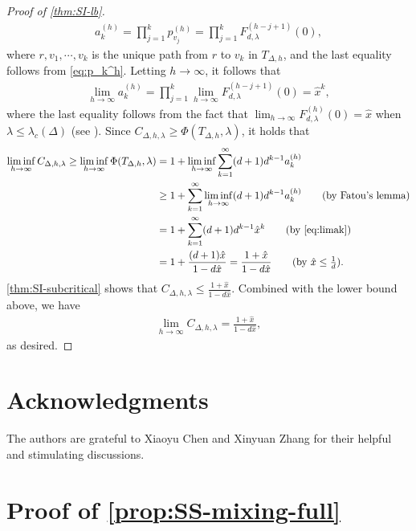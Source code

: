 \documentclass[11pt]{article}
\theoremstyle{plain}
\theoremstyle{definition}
\theoremstyle{remark}
\begin{document}
\begin{proof}[Proof of \cref{thm:SI-lb}]
\begin{align*}
    a_k^{(h)}=\prod_{j=1}^kp^{(h)}_{v_j}=\prod_{j=1}^kF_{d,\lambda}^{(h-j+1)}(0),
\end{align*}
where $r,v_1,\cdots,v_k$ is the unique path from $r$ to $v_k$ in $T_{\Delta,h}$, and the last equality follows from \cref{eq:p_k^h}.
Letting $h\rightarrow\infty$, it follows that  
\begin{align} \label{eq:limak}
    \lim_{h\rightarrow\infty} a_k^{(h)}=\prod_{j=1}^k \lim_{h\rightarrow\infty}F_{d,\lambda}^{(h-j+1)}(0)=\hat x^k,
\end{align}
where the last equality follows from the fact that $\lim_{h\rightarrow\infty}F_{d,\lambda}^{(h)}(0)=\hat x$ when $\lambda \le \lambda_c(\Delta)$ (see \cite{kelly1985stochastic,li2013correlation}).
Since $C_{\Delta,h,\lambda}\geq \Phi(T_{\Delta,h},\lambda)$, it holds that
\begin{align*}
    \liminf_{h\rightarrow\infty} C_{\Delta,h,\lambda}\geq\liminf_{h\rightarrow\infty} \Phi(T_{\Delta,h},\lambda)
    &=1+\liminf_{h\rightarrow\infty}\sum_{k=1}^{\infty} (d+1)d^{k-1}a_k^{(h)}\nonumber\\
    &\geq1+\sum_{k=1}^{\infty}\liminf_{h\rightarrow\infty}(d+1)d^{k-1}a_k^{(h)}\tag{by Fatou's lemma}\\
    &=1+ \sum_{k=1}^{\infty} (d+1)d^{k-1}\hat x^k\tag{by \cref{eq:limak}}\\
    &=1 + \frac{(d+1)\hat x}{1-d\hat x}=\frac{1+\hat x}{1-d\hat x}\tag{by $\hat x\leq \frac 1d$}.
\end{align*}
\cref{thm:SI-subcritical} shows that $C_{\Delta,h,\lambda}\leq\frac{1+\hat x}{1-d\hat x}$. Combined with the lower bound above, we have
\begin{align*}
    \lim_{h\rightarrow\infty} C_{\Delta,h,\lambda}=\frac{1+\hat x}{1-d\hat x},
\end{align*}
as desired.
\end{proof}

\section*{Acknowledgments}
The authors are grateful to Xiaoyu Chen and Xinyuan Zhang for their helpful and stimulating discussions.





\appendix

\section{Proof of \texorpdfstring{\cref{prop:SS-mixing-full}}{Proposition 2.3}}
\label{subsec:pf-SI-mixing}
\end{document}
